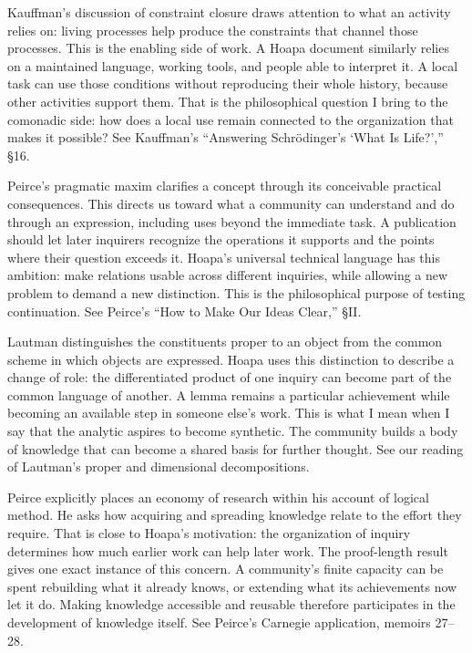\documentclass[a4paper,14pt]{extarticle}
\newcommand{\guidegroup}[1]{\par\addvspace{10pt}\needspace{4\baselineskip}{\bfseries #1\par}\nopagebreak}
\begin{document}
\guidegroup{\color{storecomonadtangerine}Store comonad}
\par\addvspace{6pt}Kauffman's discussion of constraint closure draws attention to what an activity relies on: living processes help produce the constraints that channel those processes. This is the enabling side of work. A Hoapa document similarly relies on a maintained language, working tools, and people able to interpret it. A local task can use those conditions without reproducing their whole history, because other activities support them. That is the philosophical question I bring to the comonadic side: how does a local use remain connected to the organization that makes it possible? See Kauffman's “Answering Schrödinger's ‘What Is Life?’,” §16.\par
\guidegroup{\color{continuationmint}Continuation}
\par\addvspace{6pt}Peirce's pragmatic maxim clarifies a concept through its conceivable practical consequences. This directs us toward what a community can understand and do through an expression, including uses beyond the immediate task. A publication should let later inquirers recognize the operations it supports and the points where their question exceeds it. Hoapa's universal technical language has this ambition: make relations usable across different inquiries, while allowing a new problem to demand a new distinction. This is the philosophical purpose of testing continuation. See Peirce's “How to Make Our Ideas Clear,” §II.\par
\guidegroup{\color{replayolive}Cut}
\par\addvspace{6pt}Lautman distinguishes the constituents proper to an object from the common scheme in which objects are expressed. Hoapa uses this distinction to describe a change of role: the differentiated product of one inquiry can become part of the common language of another. A lemma remains a particular achievement while becoming an available step in someone else's work. This is what I mean when I say that the analytic aspires to become synthetic. The community builds a body of knowledge that can become a shared basis for further thought. See our reading of Lautman's proper and dimensional decompositions.\par
\guidegroup{\color{feasibilitysienna}Feasibility}
\par\addvspace{6pt}Peirce explicitly places an economy of research within his account of logical method. He asks how acquiring and spreading knowledge relate to the effort they require. That is close to Hoapa's motivation: the organization of inquiry determines how much earlier work can help later work. The proof-length result gives one exact instance of this concern. A community's finite capacity can be spent rebuilding what it already knows, or extending what its achievements now let it do. Making knowledge accessible and reusable therefore participates in the development of knowledge itself. See Peirce's Carnegie application, memoirs 27–28.\par
\end{document}
